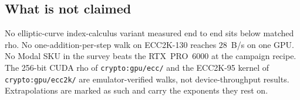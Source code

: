 \subsection{What is not claimed}

No elliptic-curve index-calculus variant measured end to end sits
below matched rho. No one-addition-per-step walk on ECC2K-130 reaches
$28$~B/s on one GPU. No Modal SKU in the survey beats the RTX~PRO~6000
at the campaign recipe. The 256-bit CUDA rho of \texttt{crypto:gpu/ecc/}
and the ECC2K-95 kernel of \texttt{crypto:gpu/ecc2k/} are emulator-verified
walks, not device-throughput results. Extrapolations are marked as
such and carry the exponents they rest on.
